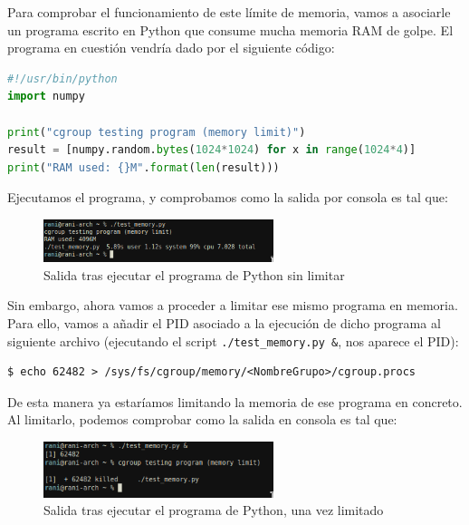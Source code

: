 \documentclass[a4paper, oneside, 12pt]{book}
\begin{document}
	\noindent Para comprobar el funcionamiento de este límite de memoria, vamos a asociarle un programa escrito en Python que consume mucha memoria RAM de golpe. El programa en cuestión vendría dado por el siguiente código:
	\begin{lstlisting}[language=Python, caption={Programa en Python que consume 4 GB de RAM}]
#!/usr/bin/python
import numpy

print("cgroup testing program (memory limit)")
result = [numpy.random.bytes(1024*1024) for x in range(1024*4)]
print("RAM used: {}M".format(len(result)))
	\end{lstlisting}

	\noindent Ejecutamos el programa, y comprobamos como la salida por consola es tal que: 
	
	\begin{figure}[h!]
		\begin{center}
			\includegraphics[width=0.6\textwidth]{img/cgroup_python1.png}
			\caption{Salida tras ejecutar el programa de Python sin limitar}
			\label{img: cgroup python 1}
		\end{center}
	\end{figure}

	\noindent Sin embargo, ahora vamos a proceder a limitar ese mismo programa en memoria. Para ello, vamos a añadir el PID asociado a la ejecución de dicho programa al siguiente archivo (ejecutando el script \texttt{./test\_memory.py \&}, nos aparece el PID):
	\begin{verbatim}
$ echo 62482 > /sys/fs/cgroup/memory/<NombreGrupo>/cgroup.procs
	\end{verbatim}
	
	\noindent De esta manera ya estaríamos limitando la memoria de ese programa en concreto. Al limitarlo, podemos comprobar como la salida en consola es tal que: 
	
	\begin{figure}[h!]
		\begin{center}
			\includegraphics[width=0.6\textwidth]{img/cgroup_python2.png}
			\caption{Salida tras ejecutar el programa de Python, una vez limitado}
			\label{img: cgroup python 2}
		\end{center}
	\end{figure}
\end{document}
